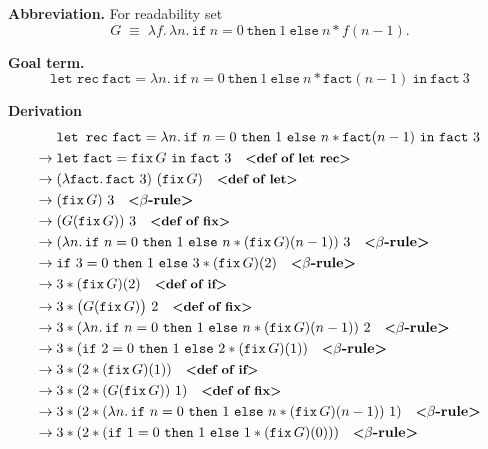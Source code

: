 \documentclass{article}
\theoremstyle{plain}
\theoremstyle{definition}
\theoremstyle{remark}
\begin{document}
\textbf{Abbreviation.}  
For readability set
\[
G \;\equiv\; \lambda f.\,\lambda n.\, \texttt{if}\ n=0\ \texttt{then}\ 1\ \texttt{else}\ n * f(n-1).
\]

\textbf{Goal term.}
\[
\texttt{let rec}\ \texttt{fact} = \lambda n.\, \texttt{if}\ n=0\ \texttt{then}\ 1\ \texttt{else}\ n * \texttt{fact}(n-1)\ \texttt{in}\ \texttt{fact}\ 3
\]

\textbf{Derivation}
\[
\begin{aligned}
&\texttt{let rec}\ \texttt{fact} = \lambda n.\,\texttt{if}\ n=0\ \texttt{then}\ 1\ \texttt{else}\ n * \texttt{fact}(n-1)\ \texttt{in}\ \texttt{fact}\ 3
\\
\to\;& \texttt{let}\ \texttt{fact} = \texttt{fix}\,G\ \texttt{in}\ \texttt{fact}\ 3 \quad \textbf{\small<def of let rec>}
\\
\to\;& (\lambda \texttt{fact}.\, \texttt{fact}\ 3)\ (\texttt{fix}\,G) \quad \textbf{\small<def of let>}
\\
\to\;& (\texttt{fix}\,G)\ 3 \quad \textbf{\small<}\beta\textbf{-rule>}
\\
\to\;& (G(\texttt{fix}\,G))\ 3 \quad \textbf{\small<def of fix>}
\\
\to\;& (\lambda n.\, \texttt{if}\ n=0\ \texttt{then}\ 1\ \texttt{else}\ n*(\texttt{fix}\,G)(n-1))\ 3 \quad \textbf{\small<}\beta\textbf{-rule>}
\\
\to\;& \texttt{if}\ 3=0\ \texttt{then}\ 1\ \texttt{else}\ 3 * (\texttt{fix}\,G)(2) \quad \textbf{\small<}\beta\textbf{-rule>}
\\
\to\;& 3 * (\texttt{fix}\,G)(2) \quad \textbf{\small<def of if>}
\\
\to\;& 3 * \big(G(\texttt{fix}\,G)\big)\ 2 \quad \textbf{\small<def of fix>}
\\
\to\;& 3 * (\lambda n.\,\texttt{if}\ n=0\ \texttt{then}\ 1\ \texttt{else}\ n*(\texttt{fix}\,G)(n-1))\ 2 \quad \textbf{\small<}\beta\textbf{-rule>}
\\
\to\;& 3 * (\texttt{if}\ 2=0\ \texttt{then}\ 1\ \texttt{else}\ 2*(\texttt{fix}\,G)(1)) \quad \textbf{\small<}\beta\textbf{-rule>}
\\
\to\;& 3 * (2 * (\texttt{fix}\,G)(1)) \quad \textbf{\small<def of if>}
\\
\to\;& 3 * (2 * (G(\texttt{fix}\,G))\ 1) \quad \textbf{\small<def of fix>}
\\
\to\;& 3 * (2 * (\lambda n.\,\texttt{if}\ n=0\ \texttt{then}\ 1\ \texttt{else}\ n*(\texttt{fix}\,G)(n-1))\ 1) \quad \textbf{\small<}\beta\textbf{-rule>}
\\
\to\;& 3 * (2 * (\texttt{if}\ 1=0\ \texttt{then}\ 1\ \texttt{else}\ 1*(\texttt{fix}\,G)(0))) \quad \textbf{\small<}\beta\textbf{-rule>}

\end{aligned}\]
\end{document}
